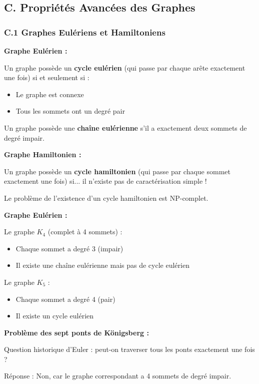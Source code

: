 \documentclass[12pt,a4paper]{article}
\begin{document}
\newpage
\subsection*{C. Propriétés Avancées des Graphes}

\subsubsection*{C.1 Graphes Eulériens et Hamiltoniens}

\begin{definition}
\textbf{Graphe Eulérien :}

Un graphe possède un \textcolor{titrebleu}{\textbf{cycle eulérien}} (qui passe par chaque arête exactement une fois) si et seulement si :
\begin{itemize}
    \item Le graphe est connexe
    \item Tous les sommets ont un degré pair
\end{itemize}

Un graphe possède une \textcolor{defvert}{\textbf{chaîne eulérienne}} s'il a exactement deux sommets de degré impair.

\textbf{Graphe Hamiltonien :}

Un graphe possède un \textcolor{algoviolet}{\textbf{cycle hamiltonien}} (qui passe par chaque sommet exactement une fois) si... il n'existe pas de caractérisation simple !

Le problème de l'existence d'un cycle hamiltonien est NP-complet.
\end{definition}

\begin{exemple}
\textbf{Graphe Eulérien :}

Le graphe $K_4$ (complet à 4 sommets) :
\begin{itemize}
    \item Chaque sommet a degré 3 (impair)
    \item Il existe une chaîne eulérienne mais pas de cycle eulérien
\end{itemize}

Le graphe $K_5$ :
\begin{itemize}
    \item Chaque sommet a degré 4 (pair)
    \item Il existe un cycle eulérien
\end{itemize}

\textbf{Problème des sept ponts de Königsberg :}

Question historique d'Euler : peut-on traverser tous les ponts exactement une fois ?

Réponse : Non, car le graphe correspondant a 4 sommets de degré impair.
\end{exemple}
\end{document}
